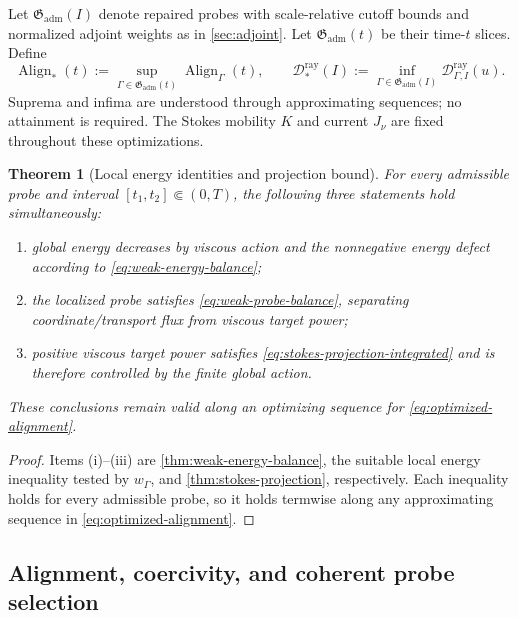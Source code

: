 \documentclass[11pt]{amsart}
\numberwithin{equation}{section}
\theoremstyle{plain}
\newtheorem{theorem}{Theorem}[section]
\theoremstyle{definition}
\theoremstyle{remark}
\newcommand{\Align}{\operatorname{Align}}
\newcommand{\RayDefect}{\mathscr D^{\mathrm{ray}}}
\begin{document}
Let \(\mathfrak G_{\mathrm{adm}}(I)\) denote repaired probes with
scale-relative cutoff bounds and normalized adjoint weights as in
\cref{sec:adjoint}.  Let \(\mathfrak G_{\mathrm{adm}}(t)\) be their time-\(t\)
slices.  Define
\begin{equation}\label{eq:optimized-alignment}
 \Align_*(t):=\sup_{\Gamma\in\mathfrak G_{\mathrm{adm}}(t)}
 \Align_\Gamma(t),
 \qquad
 \RayDefect_*(I):=\inf_{\Gamma\in\mathfrak G_{\mathrm{adm}}(I)}
 \RayDefect_{\Gamma,I}(u).
\end{equation}
Suprema and infima are understood through approximating sequences; no
attainment is required.  The Stokes mobility \(K\) and current \(J_\nu\) are
fixed throughout these optimizations.

\begin{theorem}[Local energy identities and projection bound]
\label{thm:local-monotonicity}
For every admissible probe and interval \([t_1,t_2]\Subset(0,T)\), the
following three statements hold simultaneously:
\begin{enumerate}[label=\textup{(\roman*)},leftmargin=2.2em]
\item global energy decreases by viscous action and the nonnegative energy
defect according to \eqref{eq:weak-energy-balance};
\item the localized probe satisfies \eqref{eq:weak-probe-balance}, separating
coordinate/transport flux from viscous target power;
\item positive viscous target power satisfies
\eqref{eq:stokes-projection-integrated} and is therefore controlled by the finite
global action.
\end{enumerate}
These conclusions remain valid along an optimizing sequence for
\eqref{eq:optimized-alignment}.
\end{theorem}

\begin{proof}
Items \textup{(i)--(iii)} are
\cref{thm:weak-energy-balance}, the suitable local energy inequality tested by
\(w_\Gamma\), and \cref{thm:stokes-projection}, respectively.  Each inequality
holds for every admissible probe, so it holds termwise along any approximating
sequence in \eqref{eq:optimized-alignment}.
\end{proof}

\subsection{Alignment, coercivity, and coherent probe selection}
\end{document}
